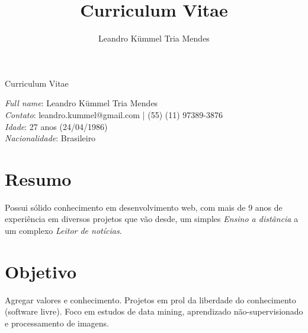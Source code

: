 \documentclass[a4paper,10pt]{article}
\title{Curriculum Vitae}
\author{Leandro Kümmel Tria Mendes}
\begin{document}
\begin{center} 
Curriculum Vitae
\end{center} 
\emph{Full name}: Leandro Kümmel Tria Mendes\\
\emph{Contato}: leandro.kummel@gmail.com | (55) (11) 97389-3876\\
\emph{Idade}: 27 anos (24/04/1986)\\
\emph{Nacionalidade}: Brasileiro\\
\section{Resumo}
Possui sólido conhecimento em desenvolvimento web, com mais de 9 anos de experiência em diversos projetos que vão desde, um simples \emph{Ensino a distância} a um complexo \emph{Leitor de notícias}.
\section{Objetivo}
Agregar valores e conhecimento. Projetos em prol da liberdade do conhecimento (software livre). 
Foco em estudos de data mining, aprendizado não-supervisionado e processamento de imagens. 
\end{document}
